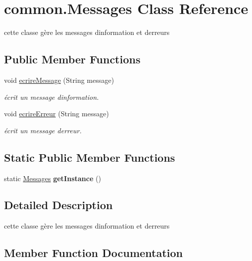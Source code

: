 \hypertarget{classcommon_1_1Messages}{}\section{common.\+Messages Class Reference}
\label{classcommon_1_1Messages}


cette classe gère les messages d\textquotesingle{}information et d\textquotesingle{}erreurs  


\subsection*{Public Member Functions}
\begin{DoxyCompactItemize}
\item 
void \hyperlink{classcommon_1_1Messages_a6069bc66b0eda8fdd5966a7c7a8a1a0a}{ecrire\+Message} (String message)
\begin{DoxyCompactList}\small\item\em écrit un message d\textquotesingle{}information. \end{DoxyCompactList}\item 
void \hyperlink{classcommon_1_1Messages_a5d8d6f3ce6024d78171f9e49de7f6136}{ecrire\+Erreur} (String message)
\begin{DoxyCompactList}\small\item\em écrit un message d\textquotesingle{}erreur. \end{DoxyCompactList}\end{DoxyCompactItemize}
\subsection*{Static Public Member Functions}
\begin{DoxyCompactItemize}
\item 
\mbox{\label{classcommon_1_1Messages_a96928a28b3f958fc717fca2c076f773c}} 
static \hyperlink{classcommon_1_1Messages}{Messages} {\bfseries get\+Instance} ()
\end{DoxyCompactItemize}


\subsection{Detailed Description}
cette classe gère les messages d\textquotesingle{}information et d\textquotesingle{}erreurs 

\subsection{Member Function Documentation}
\mbox{\label{classcommon_1_1Messages_a5d8d6f3ce6024d78171f9e49de7f6136}} 

